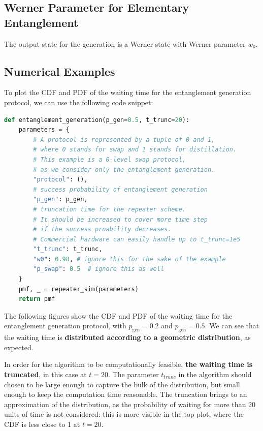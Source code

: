 \documentclass{masterthesis}
\begin{document}
\subsection*{Werner Parameter for Elementary Entanglement}

The output state for the generation is a Werner state with Werner parameter $w_0$. 

\subsection*{Numerical Examples}

To plot the CDF and PDF of the waiting time for the entanglement generation protocol, we can use the following code snippet:
\begin{lstlisting}[language=Python]
def entanglement_generation(p_gen=0.5, t_trunc=20):
    parameters = {
        # A protocol is represented by a tuple of 0 and 1,
        # where 0 stands for swap and 1 stands for distillation.
        # This example is a 0-level swap protocol,
        # as we consider only the entanglement generation.
        "protocol": (),
        # success probability of entanglement generation
        "p_gen": p_gen,
        # truncation time for the repeater scheme.
        # It should be increased to cover more time step
        # if the success proability decreases.
        # Commercial hardware can easily handle up to t_trunc=1e5
        "t_trunc": t_trunc,
        "w0": 0.98, # ignore this for the sake of the example
        "p_swap": 0.5  # ignore this as well
    }
    pmf, _ = repeater_sim(parameters)
    return pmf
\end{lstlisting}
The following figures show the CDF and PDF of the waiting time for the entanglement generation protocol, with $p_{\text{gen}} = 0.2$ and $p_{\text{gen}} = 0.5$. We can see that the waiting time is \textbf{distributed according to a geometric distribution}, as expected.

In order for the algorithm to be computationally feasible, \textbf{the waiting time is truncated}, in this case at $t = 20$. The parameter $t_{trunc}$ in the algorithm should chosen to be large enough to capture the bulk of the distribution, but small enough to keep the computation time reasonable. The truncation brings to an approximation of the distribution, as the probability of waiting for more than 20 units of time is not considered: this is more visible in the top plot, where the CDF is less close to 1 at $t = 20$.
\end{document}
